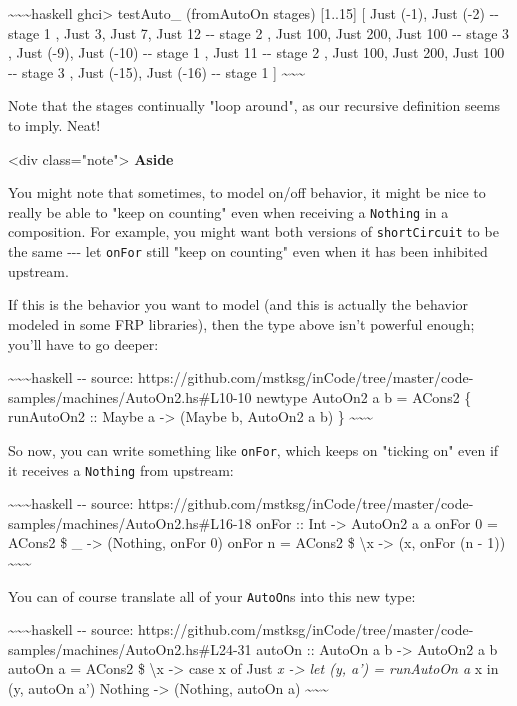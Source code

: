 \documentclass[]{article}
\begin{document}
\textasciitilde{}\textasciitilde{}\textasciitilde{}haskell ghci\textgreater{}
testAuto\_ (fromAutoOn stages) {[}1..15{]} {[} Just (-1), Just (-2) -\/- stage 1
, Just 3, Just 7, Just 12 -\/- stage 2 , Just 100, Just 200, Just 100 -\/- stage
3 , Just (-9), Just (-10) -\/- stage 1 , Just 11 -\/- stage 2 , Just 100, Just
200, Just 100 -\/- stage 3 , Just (-15), Just (-16) -\/- stage 1 {]}
\textasciitilde{}\textasciitilde{}\textasciitilde{}

Note that the stages continually "loop around", as our recursive definition
seems to imply. Neat!

\textless{}div class="note"\textgreater{} \textbf{Aside}

You might note that sometimes, to model on/off behavior, it might be nice to
really be able to "keep on counting" even when receiving a \texttt{Nothing} in a
composition. For example, you might want both versions of \texttt{shortCircuit}
to be the same -\/-\/- let \texttt{onFor} still "keep on counting" even when it
has been inhibited upstream.

If this is the behavior you want to model (and this is actually the behavior
modeled in some FRP libraries), then the type above isn't powerful enough;
you'll have to go deeper:

\textasciitilde{}\textasciitilde{}\textasciitilde{}haskell -\/- source:
https://github.com/mstksg/inCode/tree/master/code-samples/machines/AutoOn2.hs\#L10-10
newtype AutoOn2 a b = ACons2 \{ runAutoOn2 :: Maybe a -\textgreater{} (Maybe b,
AutoOn2 a b) \} \textasciitilde{}\textasciitilde{}\textasciitilde{}

So now, you can write something like \texttt{onFor}, which keeps on "ticking on"
even if it receives a \texttt{Nothing} from upstream:

\textasciitilde{}\textasciitilde{}\textasciitilde{}haskell -\/- source:
https://github.com/mstksg/inCode/tree/master/code-samples/machines/AutoOn2.hs\#L16-18
onFor :: Int -\textgreater{} AutoOn2 a a onFor 0 = ACons2 \$ \_ -\textgreater{}
(Nothing, onFor 0) onFor n = ACons2 \$ \textbackslash{}x -\textgreater{} (x,
onFor (n - 1)) \textasciitilde{}\textasciitilde{}\textasciitilde{}

You can of course translate all of your \texttt{AutoOn}s into this new type:

\textasciitilde{}\textasciitilde{}\textasciitilde{}haskell -\/- source:
https://github.com/mstksg/inCode/tree/master/code-samples/machines/AutoOn2.hs\#L24-31
autoOn :: AutoOn a b -\textgreater{} AutoOn2 a b autoOn a = ACons2 \$
\textbackslash{}x -\textgreater{} case x of Just \emph{x -\textgreater{} let (y,
a') = runAutoOn a }x in (y, autoOn a') Nothing -\textgreater{} (Nothing, autoOn
a) \textasciitilde{}\textasciitilde{}\textasciitilde{}
\end{document}
